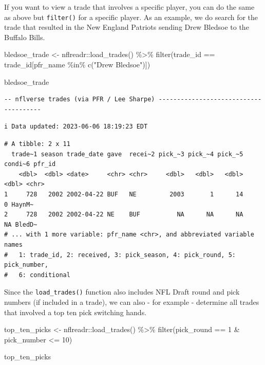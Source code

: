 \documentclass[
  letterpaper,
]{krantz}
\newenvironment{Shaded}{\begin{snugshade}}{\end{snugshade}}
\newcommand{\DecValTok}[1]{\textcolor[rgb]{0.68,0.00,0.00}{#1}}
\newcommand{\FunctionTok}[1]{\textcolor[rgb]{0.28,0.35,0.67}{#1}}
\newcommand{\NormalTok}[1]{\textcolor[rgb]{0.00,0.23,0.31}{#1}}
\newcommand{\OtherTok}[1]{\textcolor[rgb]{0.00,0.23,0.31}{#1}}
\newcommand{\SpecialCharTok}[1]{\textcolor[rgb]{0.37,0.37,0.37}{#1}}
\newcommand{\StringTok}[1]{\textcolor[rgb]{0.13,0.47,0.30}{#1}}
\begin{document}
If you want to view a trade that involves a specific player, you can do
the same as above but \texttt{filter()} for a specific player. As an
example, we do search for the trade that resulted in the New England
Patriots sending Drew Bledsoe to the Buffalo Bills.

\begin{Shaded}
\begin{Highlighting}[]
\NormalTok{bledsoe\_trade }\OtherTok{\textless{}{-}}\NormalTok{ nflreadr}\SpecialCharTok{::}\FunctionTok{load\_trades}\NormalTok{() }\SpecialCharTok{\%\textgreater{}\%}
  \FunctionTok{filter}\NormalTok{(trade\_id }\SpecialCharTok{==}\NormalTok{ trade\_id[pfr\_name }\SpecialCharTok{\%in\%} \FunctionTok{c}\NormalTok{(}\StringTok{"Drew Bledsoe"}\NormalTok{)])}

\NormalTok{bledsoe\_trade}
\end{Highlighting}
\end{Shaded}

\begin{verbatim}
-- nflverse trades (via PFR / Lee Sharpe) --------------------------------------
\end{verbatim}

\begin{verbatim}
i Data updated: 2023-06-06 18:19:23 EDT
\end{verbatim}

\begin{verbatim}
# A tibble: 2 x 11
  trade~1 season trade_date gave  recei~2 pick_~3 pick_~4 pick_~5 condi~6 pfr_id
    <dbl>  <dbl> <date>     <chr> <chr>     <dbl>   <dbl>   <dbl>   <dbl> <chr> 
1     728   2002 2002-04-22 BUF   NE         2003       1      14       0 HaynM~
2     728   2002 2002-04-22 NE    BUF          NA      NA      NA      NA BledD~
# ... with 1 more variable: pfr_name <chr>, and abbreviated variable names
#   1: trade_id, 2: received, 3: pick_season, 4: pick_round, 5: pick_number,
#   6: conditional
\end{verbatim}

Since the \texttt{load\_trades()} function also includes NFL Draft round
and pick numbers (if included in a trade), we can also - for example -
determine all trades that involved a top ten pick switching hands.

\begin{Shaded}
\begin{Highlighting}[]
\NormalTok{top\_ten\_picks }\OtherTok{\textless{}{-}}\NormalTok{ nflreadr}\SpecialCharTok{::}\FunctionTok{load\_trades}\NormalTok{() }\SpecialCharTok{\%\textgreater{}\%}
  \FunctionTok{filter}\NormalTok{(pick\_round }\SpecialCharTok{==} \DecValTok{1} \SpecialCharTok{\&}\NormalTok{ pick\_number }\SpecialCharTok{\textless{}=} \DecValTok{10}\NormalTok{)}

\NormalTok{top\_ten\_picks}
\end{Highlighting}
\end{Shaded}
\end{document}
